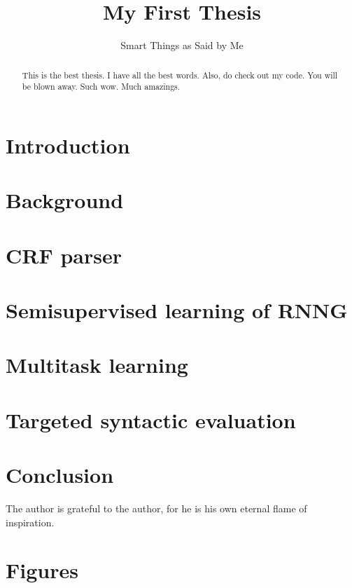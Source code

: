 \documentclass[examplefnt,biber]{../src/nowfnt} %
\title{My First Thesis}
\subtitle{Smart Things as Said by Me}
\begin{document}
\makeabstracttitle

\begin{abstract}
This is the best thesis. I have all the best words. Also, do check out my code. You will be blown away. Such wow. Much amazings.

\end{abstract}


\chapter{Introduction}
\label{01-introduction}



\chapter{Background}
\label{02-background}



\chapter{CRF parser}
\label{04-crf}



\chapter{Semisupervised learning of RNNG}
\label{05-semisupervised}



\chapter{Multitask learning}
\label{06-multitask}



\chapter{Targeted syntactic evaluation}
\label{07-syneval}



\chapter{Conclusion}
\label{09-conclusion}




\begin{acknowledgements}
The author is grateful to the author, for he is his own eternal flame of inspiration.
\end{acknowledgements}

\appendix
\chapter{Figures}
\label{App:journalcodes}

\backmatter  %

\printbibliography
\end{document}

